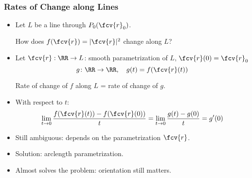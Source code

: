 \begin{frame}
  \frametitle{Rates of Change along Lines}
\begin{itemize}
\item Let $L$ be a line through $P_0(\fcv{r}_0)$.
\begin{center}  How does $f(\fcv{r}) = |\fcv{r}|^2$ change \alert<1->{along $L$}?  
\end{center}
\item<2-> Let $\fcv{r} : \RR \to L$: smooth parametrization of $L$, $\fcv{r}(0) = \fcv{r}_0$
$$g\colon \RR \to \RR, \quad g(t) = f(\fcv{r}(t))$$
\begin{center}
    Rate of change of $f$ along $L$ = rate of change of $g$.
  \end{center}
\item<3-> With respect to $t$:
  $$\lim_{t\to 0} \frac{f(\fcv{r}(t))-f(\fcv{r}(0))}{t} =
  \lim_{t\to 0} \frac{g(t)-g(0)}{t} = g'(0)$$
\item<4-> Still ambiguous: depends on the parametrization $\fcv{r}$.
\item<5-> Solution: arclength parametrization.
\item<6-> Almost solves the problem: orientation still matters.
\end{itemize}
\end{frame}
